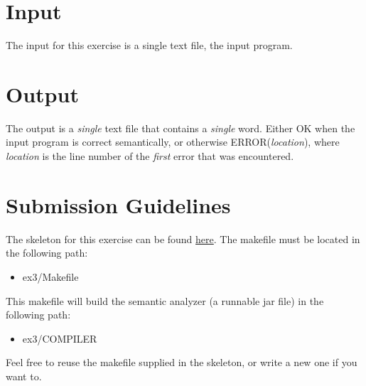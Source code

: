 \documentclass{article}
\begin{document}
\section{Input}
The input for this exercise is a single text file, the input \plname program.

\section{Output}
The output is a \textit{single} text file that contains a \textit{single} word.
Either OK when the input program is correct semantically,
or otherwise ERROR(\textit{location}), where \textit{location}
is the line number of the \textit{first} error that was encountered.

\section{Submission Guidelines}
The skeleton for this exercise can be found \href{https://github.com/davidtr1037/compilation-tau/tree/master/src/ex3}{here}.
The makefile must be located in the following path:
\begin{itemize}
    \item ex3/Makefile
\end{itemize}
This makefile will build the semantic analyzer (a runnable jar file) in the following path:
\begin{itemize}
    \item ex3/COMPILER
\end{itemize}
Feel free to reuse the makefile supplied in the skeleton, or write a new one if you want to.

\end{document}
